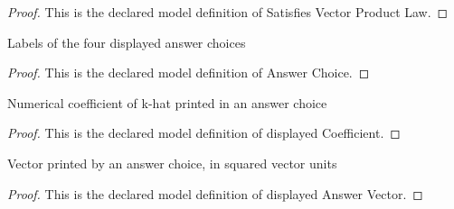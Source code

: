 \begin{proof}
  This is the declared model definition of Satisfies Vector Product Law.
\end{proof}
\begin{definition}
  \label{def:physics:phyx-mini-0792:phyxminiproblems-problemphyxmini0792-answerchoice}
  Labels of the four displayed answer choices
\end{definition}
\begin{proof}
  This is the declared model definition of Answer Choice.
\end{proof}
\begin{definition}
  \label{def:physics:phyx-mini-0792:phyxminiproblems-problemphyxmini0792-displayedcoefficient}
  Numerical coefficient of k-hat printed in an answer choice
\end{definition}
\begin{proof}
  This is the declared model definition of displayed Coefficient.
\end{proof}
\begin{definition}
  \label{def:physics:phyx-mini-0792:phyxminiproblems-problemphyxmini0792-displayedanswervector}
  Vector printed by an answer choice, in squared vector units
\end{definition}
\begin{proof}
  This is the declared model definition of displayed Answer Vector.
\end{proof}

